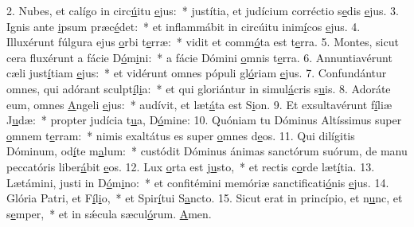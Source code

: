 2. Nubes, et calígo in circ\uline{ú}itu \uline{e}jus:~* justítia, et judícium corréctio s\uline{e}dis \uline{e}jus.
3. Ignis ante \uline{i}psum præc\uline{é}det:~* et inflammábit in circúitu inim\uline{í}cos \uline{e}jus.
4. Illuxérunt fúlgura ejus \uline{o}rbi t\uline{e}rræ:~* vidit et comm\uline{ó}ta est t\uline{e}rra.
5. Montes, sicut cera fluxérunt a fácie D\uline{ó}m\uline{i}ni:~* a fácie Dómini \uline{o}mnis t\uline{e}rra.
6. Annuntiavérunt cæli just\uline{í}tiam \uline{e}jus:~* et vidérunt omnes pópuli gl\uline{ó}riam \uline{e}jus.
7. Confundántur omnes, qui adórant sculpt\uline{í}l\uline{i}a:~* et qui gloriántur in simul\uline{á}cris s\uline{u}is.
8. Adoráte eum, omnes \uline{A}ngeli \uline{e}jus:~* audívit, et læt\uline{á}ta est S\uline{i}on.
9. Et exsultavérunt f\uline{í}liæ J\uline{u}dæ:~* propter judícia t\uline{u}a, D\uline{ó}mine:
10. Quóniam tu Dóminus Altíssimus super \uline{o}mnem t\uline{e}rram:~* nimis exaltátus es super \uline{o}mnes d\uline{e}os.
11. Qui dilígitis Dóminum, od\uline{í}te m\uline{a}lum:~* custódit Dóminus ánimas sanctórum suórum, de manu peccatóris liber\uline{á}bit \uline{e}os.
12. Lux \uline{o}rta est j\uline{u}sto,~* et rectis c\uline{o}rde læt\uline{í}tia.
13. Lætámini, justi in D\uline{ó}m\uline{i}no:~* et confitémini memóriæ sanctificati\uline{ó}nis \uline{e}jus.
14. Glória Patri, et F\uline{í}l\uline{i}o,~* et Spir\uline{í}tui S\uline{a}ncto.
15. Sicut erat in princípio, et n\uline{u}nc, et s\uline{e}mper,~* et in sǽcula sæcul\uline{ó}rum. \uline{A}men.

